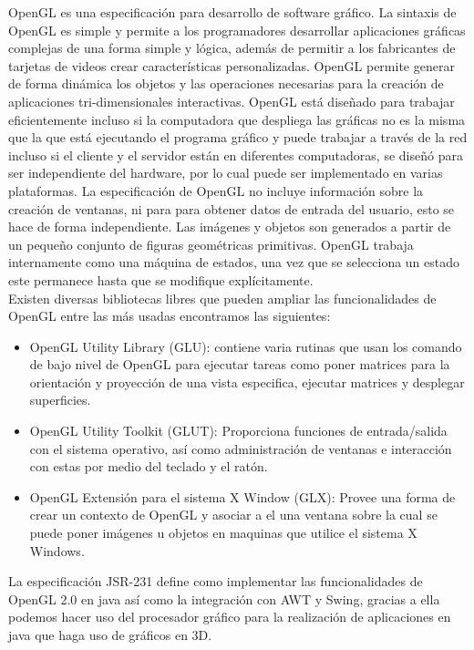 \documentclass[12pt,a4paper,spanish,openany]{book}
\begin{document}
OpenGL es una especificación para desarrollo de software gráfico. La
sintaxis de OpenGL es simple y permite a los programadores desarrollar
aplicaciones gráficas complejas de una forma simple y lógica, además de permitir
a los fabricantes de tarjetas de videos crear características personalizadas.
OpenGL permite generar de forma dinámica los objetos y las operaciones
necesarias para la creación de aplicaciones tri-dimensionales interactivas.
OpenGL está diseñado para trabajar eficientemente incluso si la computadora que
despliega las gráficas no es la misma que la que está ejecutando el programa
gráfico y puede trabajar a través de la red incluso si el cliente y el servidor están en
diferentes computadoras, se diseñó para ser independiente del hardware, por
lo cual puede ser implementado en varias plataformas. La especificación de
OpenGL no incluye información sobre la creación de ventanas, ni para para
obtener datos de entrada del usuario, esto se hace de forma independiente. Las
imágenes y objetos son generados a partir de un pequeño conjunto de figuras
geométricas primitivas. OpenGL trabaja internamente como una máquina de
estados, una vez que se selecciona un estado este permanece hasta que se
modifique explícitamente.\\ Existen diversas bibliotecas libres que pueden
ampliar las funcionalidades de OpenGL entre las más usadas encontramos las siguientes: 
\begin{itemize}
  \item OpenGL Utility Library (GLU): contiene varia rutinas que usan los
  comando de bajo nivel de OpenGL para ejecutar tareas como poner matrices para
  la orientación y proyección de una vista especifica, ejecutar matrices y
  desplegar superficies.
  \item OpenGL Utility Toolkit (GLUT): Proporciona funciones de entrada/salida
  con el sistema operativo, así como administración de ventanas e interacción
  con estas por medio del teclado y el ratón.
  \item OpenGL Extensión para el sistema X Window (GLX): Provee una forma de
  crear un contexto de OpenGL y asociar a el una ventana sobre la cual se puede
  poner imágenes u objetos en maquinas que utilice el sistema X Windows.
\end{itemize}

La especificación JSR-231 define como implementar las funcionalidades de
OpenGL 2.0 en java así como la integración con AWT y Swing, gracias a ella
podemos hacer uso del procesador gráfico para la realización de aplicaciones en
java que haga uso de gráficos en 3D.
\end{document}
